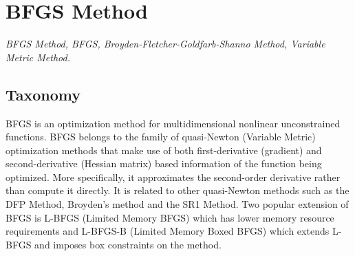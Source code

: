 
\section{BFGS Method} 
\label{sec:bfgs}

\emph{BFGS Method, BFGS, Broyden-Fletcher-Goldfarb-Shanno Method, Variable Metric Method.}

\subsection{Taxonomy}
BFGS is an optimization method for multidimensional nonlinear unconstrained functions.
BFGS belongs to the family of quasi-Newton (Variable Metric) optimization methods that make use of both first-derivative (gradient) and second-derivative (Hessian matrix) based information of the function being optimized. More specifically, it approximates the second-order derivative rather than compute it directly. It is related to other quasi-Newton methods such as the DFP Method, Broyden's method and the SR1 Method. 
Two popular extension of BFGS is L-BFGS (Limited Memory BFGS) which has lower memory resource requirements and L-BFGS-B (Limited Memory Boxed BFGS) which extends L-BFGS and imposes box constraints on the method. 


